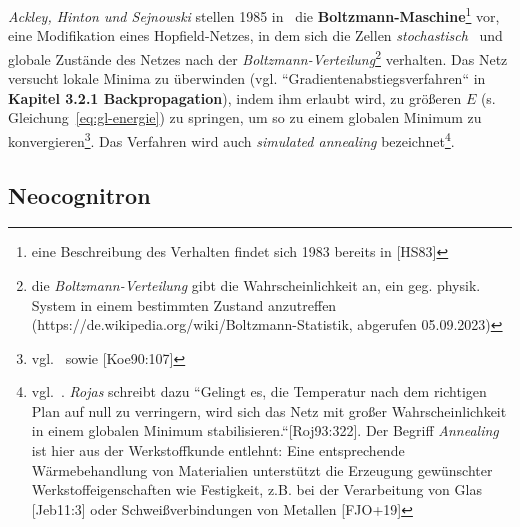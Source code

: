 \textit{Ackley, Hinton und Sejnowski} stellen 1985 in~\cite{AHS85} die \textbf{Boltzmann-Maschine}\footnote{
    eine Beschreibung des Verhalten findet sich 1983 bereits in [HS83]
} vor, eine Modifikation eines Hopfield-Netzes, in dem sich die Zellen \textit{stochastisch}~\cite[635]{AR88} und globale Zustände des Netzes nach der \textit{Boltzmann-Verteilung}\footnote{
    die \textit{Boltzmann-Verteilung} gibt die Wahrscheinlichkeit an, ein geg. physik. System in einem bestimmten Zustand anzutreffen (https://de.wikipedia.org/wiki/Boltzmann-Statistik, abgerufen  05.09.2023)
} verhalten. Das Netz versucht lokale Minima zu überwinden (vgl. ``Gradientenabstiegsverfahren`` in \textbf{Kapitel 3.2.1 Backpropagation}), indem ihm erlaubt wird, zu größeren $E$ (s. Gleichung~\ref{eq:gl-energie}) zu springen, um so zu einem globalen Minimum zu konvergieren\footnote{vgl.~\cite[151]{AHS85} sowie [Koe90:107]}.
Das Verfahren wird auch \textit{simulated annealing} bezeichnet\footnote{vgl.~\cite[297]{Ert21b}. \textit{Rojas} schreibt dazu
    ``Gelingt es, die Temperatur nach dem richtigen Plan auf null zu verringern, wird sich das Netz mit großer Wahrscheinlichkeit in einem globalen Minimum stabilisieren.``[Roj93:322]. Der Begriff \textit{Annealing} ist hier aus der Werkstoffkunde entlehnt: Eine entsprechende Wärmebehandlung von Materialien unterstützt die Erzeugung gewünschter Werkstoffeigenschaften wie Festigkeit, z.B.  bei der Verarbeitung von Glas [Jeb11:3] oder Schweißverbindungen von Metallen [FJO+19]
}.

\subsection{Neocognitron}

